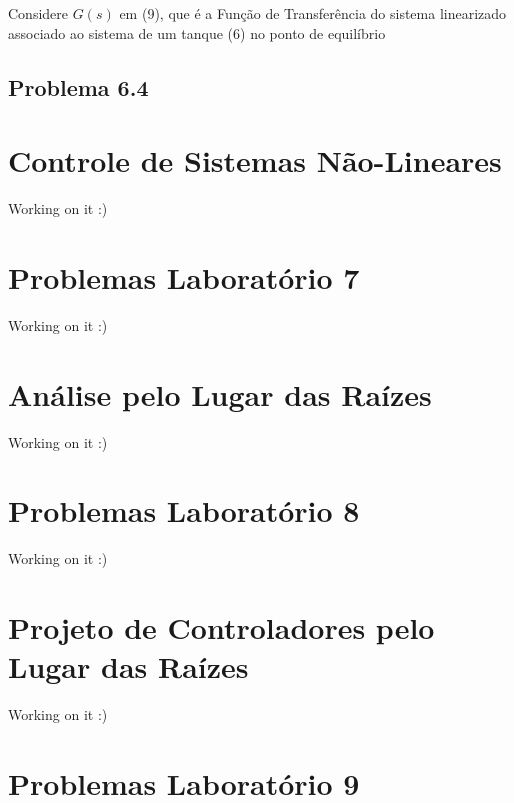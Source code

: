 \documentclass[
]{book}
\theoremstyle{definition}
\theoremstyle{definition}
\theoremstyle{definition}
\theoremstyle{remark}
\begin{document}
Considere \(G(s)\) em (9), que é a Função de Transferência do sistema linearizado associado ao sistema de um tanque (6) no ponto de equilíbrio

\hypertarget{problema-6.4}{%
\section*{Problema 6.4}\label{problema-6.4}}

\hypertarget{controle-de-sistemas-nuxe3o-lineares}{%
\chapter{Controle de Sistemas Não-Lineares}\label{controle-de-sistemas-nuxe3o-lineares}}

Working on it :)

\hypertarget{problemas-laboratuxf3rio-7}{%
\chapter*{Problemas Laboratório 7}\label{problemas-laboratuxf3rio-7}}

Working on it :)

\hypertarget{anuxe1lise-pelo-lugar-das-rauxedzes}{%
\chapter{Análise pelo Lugar das Raízes}\label{anuxe1lise-pelo-lugar-das-rauxedzes}}

Working on it :)

\hypertarget{problemas-laboratuxf3rio-8}{%
\chapter*{Problemas Laboratório 8}\label{problemas-laboratuxf3rio-8}}

Working on it :)

\hypertarget{projeto-de-controladores-pelo-lugar-das-rauxedzes}{%
\chapter{Projeto de Controladores pelo Lugar das Raízes}\label{projeto-de-controladores-pelo-lugar-das-rauxedzes}}

Working on it :)

\hypertarget{problemas-laboratuxf3rio-9}{%
\chapter*{Problemas Laboratório 9}\label{problemas-laboratuxf3rio-9}}
\end{document}
